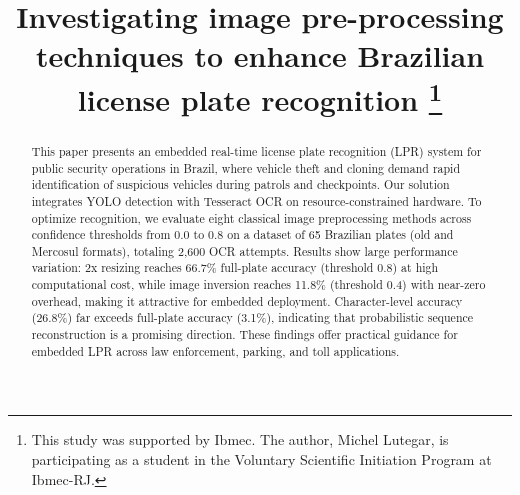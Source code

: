 \documentclass[conference,hidelinks]{IEEEtran}
\begin{document}
\title{Investigating image pre-processing techniques to enhance Brazilian license plate recognition
\thanks{This study was supported by Ibmec. The author, Michel Lutegar, is participating as a student in the Voluntary Scientific Initiation Program at Ibmec-RJ.}
}

\author{
\and
{}
\and
{}
\and
{}
}

\maketitle
\begin{abstract}
This paper presents an embedded real-time license plate recognition (LPR) system for public security operations in Brazil, where vehicle theft and cloning demand rapid identification of suspicious vehicles during patrols and checkpoints. Our solution integrates YOLO detection with Tesseract OCR on resource-constrained hardware. To optimize recognition, we evaluate eight classical image preprocessing methods across confidence thresholds from 0.0 to 0.8 on a dataset of 65 Brazilian plates (old and Mercosul formats), totaling 2,600 OCR attempts. Results show large performance variation: 2x resizing reaches 66.7\% full-plate accuracy (threshold 0.8) at high computational cost, while image inversion reaches 11.8\% (threshold 0.4) with near-zero overhead, making it attractive for embedded deployment. Character-level accuracy (26.8\%) far exceeds full-plate accuracy (3.1\%), indicating that probabilistic sequence reconstruction is a promising direction. These findings offer practical guidance for embedded LPR across law enforcement, parking, and toll applications.
\end{abstract}
\end{document}
